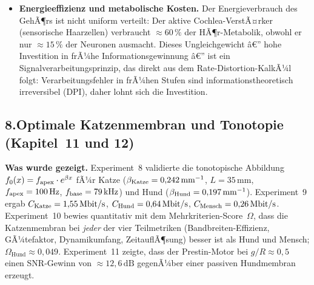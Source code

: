 ﻿\documentclass[12pt,a4paper,titlepage]{report}
\begin{document}
\begin{itemize}[leftmargin=2em]
    Die InformationskapazitÃ¤t eines Burst-Codes Ã¼bersteigt
    die eines Poisson-Spike-Trains bei gleicher Durchschnittsrate:
    Ein Burst kann binÃ¤r $2^n$ verschiedene Nachrichten kodieren,
    wobei $n$ die Anzahl mÃ¶glicher Spikes im Burst ist.
    Ob biologische Burst-Codes in diesem theoretischen Limit operieren,
    ist eine offene empirische Frage.
  \item \textbf{Energieeffizienz und metabolische Kosten.}
    Der Energieverbrauch des GehÃ¶rs ist nicht uniform verteilt:
    Der aktive Cochlea-VerstÃ¤rker (sensorische Haarzellen) verbraucht
    $\approx 60\,\%$ der HÃ¶r-Metabolik, obwohl er nur $\approx 15\,\%$
    der Neuronen ausmacht.
    Dieses Ungleichgewicht â€” hohe Investition in frÃ¼he Informationsgewinnung â€”
    ist ein Signalverarbeitungsprinzip, das direkt aus dem
    Rate-Distortion-KalkÃ¼l folgt: Verarbeitungsfehler in frÃ¼hen
    Stufen sind informationstheoretisch irreversibel (DPI),
    daher lohnt sich die Investition.
\end{itemize}

\subsection*{8.\enspace Optimale Katzenmembran und Tonotopie
(Kapitel~11 und 12)}

\textbf{Was wurde gezeigt.}
Experiment~8 validierte die tonotopische Abbildung
$f_0(x) = f_{\rm apex}\cdot e^{\beta x}$ fÃ¼r Katze
($\beta_{\rm Katze}=0{,}242\,\mathrm{mm}^{-1}$, $L=35\,\mathrm{mm}$,
$f_{\rm apex}=100\,\mathrm{Hz}$, $f_{\rm base}=79\,\mathrm{kHz}$)
und Hund ($\beta_{\rm Hund}=0{,}197\,\mathrm{mm}^{-1}$).
Experiment~9 ergab $C_{\rm Katze}=1{,}55\,\mathrm{Mbit/s}$,
$C_{\rm Hund}=0{,}64\,\mathrm{Mbit/s}$,
$C_{\rm Mensch}=0{,}26\,\mathrm{Mbit/s}$.
Experiment~10 bewies quantitativ mit dem Mehrkriterien-Score~$\Omega$,
dass die Katzenmembran bei \emph{jeder} der vier Teilmetriken
(Bandbreiten-Effizienz, GÃ¼tefaktor, Dynamikumfang, ZeitauflÃ¶sung)
besser ist als Hund und Mensch; $\Omega_\mathrm{Hund}\approx0{,}049$.
Experiment~11 zeigte, dass der Prestin-Motor bei $g/R\approx0{,}5$
einen SNR-Gewinn von $\approx 12{,}6\,\mathrm{dB}$
gegenÃ¼ber einer passiven Hundmembran erzeugt.
\end{document}
